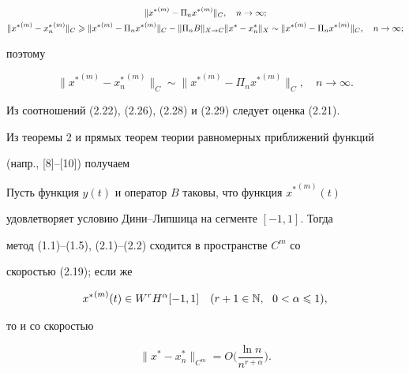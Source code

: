 \begin{pf}
\begin{gather*}
\|{x^*}^{(m)} - \Pi_n {x^*}^{(m)}\|_C,\quad n\to \infty; \\


%


\|{x^*}^{(m)} - {x^*_n}^{(m)}\|_C \gea \|{x^*}^{(m)} -


\Pi_n {x^*}^{(m)}\|_C - \|\Pi_n B\|_{X\to C}


\|x^* - x^*_n\|_X \sim \|{x^*}^{(m)}-\Pi_n {x^*}^{(m)}\|_C,\quad n\to \infty;


\end{gather*}


поэтому


\begin{equation}


\|{x^*}^{(m)} - {x^*_n}^{(m)}\|_C \sim


\|{x^*}^{(m)} - \Pi_n {x^*}^{(m)}\|_C,\quad n\to \infty.


\end{equation}


Из соотношений (2.22), (2.26), (2.28) и (2.29) следует оценка (2.21).


\end{pf}





Из теоремы 2 и прямых теорем теории равномерных приближений функций


(напр., [8]--[10]) получаем 





\begin{cornonum}


Пусть функция $y(t)$ и оператор $B$ таковы, что функция ${x^*}^{(m)}(t)$ 


удовлетворяет условию Дини--Липшица на сегменте $[-1,1]$. Тогда 


метод (1.1)--(1.5), (2.1)--(2.2) сходится в пространстве $C^m$ со 


скоростью (2.19); если же


\begin{equation}


{x^*}^{(m)}(t) \in W^r H^\alpha[-1,1]\quad (r+1\in \N,\ \ 0<\alpha\lea 1),


\end{equation}


то и со скоростью


\begin{equation}


\|x^* - x^*_n\|_{C^m} = O\bigg(\frac{\ln n}{n^{r+\alpha}}\bigg).


\end{equation}


\end{cornonum}








